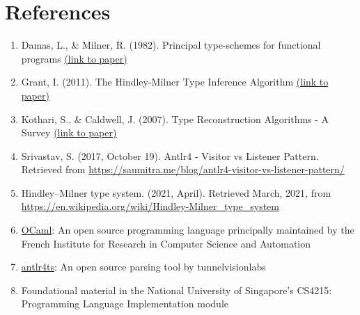 \section{References}

\begin{enumerate}
  \item Damas, L., \& Milner, R. (1982). Principal type-schemes for functional programs \href{https://web.cs.wpi.edu/~cs4536/c12/milner-damas_principal_types.pdf}{(link to paper)}
  \item Grant, I. (2011). The Hindley-Milner Type Inference Algorithm \href{https://steshaw.org/hm/hindley-milner.pdf}{(link to paper)}
  \item Kothari, S., \& Caldwell, J. (2007). Type Reconstruction Algorithms - A Survey \href{https://citeseerx.ist.psu.edu/viewdoc/download?doi=10.1.1.77.3990&rep=rep1&type=pdf}{(link to paper)}
  \item Srivastav, S. (2017, October 19). Antlr4 - Visitor vs Listener Pattern. Retrieved from \url{https://saumitra.me/blog/antlr4-visitor-vs-listener-pattern/}
  \item Hindley–Milner type system. (2021, April). Retrieved March, 2021, from \url{https://en.wikipedia.org/wiki/Hindley-Milner_type_system}
  \item \href{https://ocaml.org/}{OCaml}: An open source programming language principally maintained by the French Institute for Research in Computer Science and Automation
  \item \href{https://github.com/tunnelvisionlabs/antlr4ts}{antlr4ts}: An open source parsing tool by tunnelvisionlabs
  \item Foundational material in the National University of Singapore's CS4215: Programming Language Implementation module
\end{enumerate}
